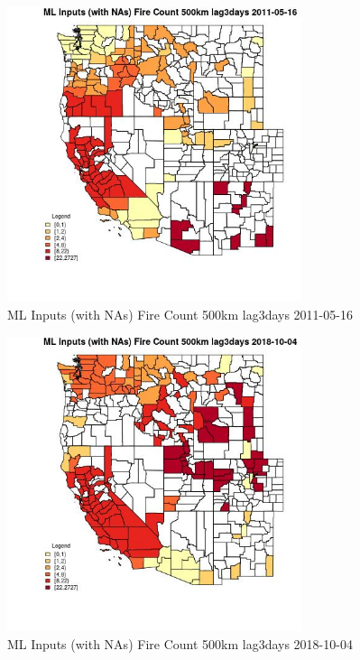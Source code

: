 \begin{figure} 
\centering  
\includegraphics[width=0.77\textwidth]{Code_Outputs/Report_ML_input_PM25_Step4_part_f_de_duplicated_aves_prioritize_24hr_obswNAs_CountyFire_Count_500km_lag3daysMean2011-05-16.jpg} 
\caption{\label{fig:Report_ML_input_PM25_Step4_part_f_de_duplicated_aves_prioritize_24hr_obswNAsCountyFire_Count_500km_lag3daysMean2011-05-16}ML Inputs (with NAs) Fire Count 500km lag3days 2011-05-16} 
\end{figure} 
 

\begin{figure} 
\centering  
\includegraphics[width=0.77\textwidth]{Code_Outputs/Report_ML_input_PM25_Step4_part_f_de_duplicated_aves_prioritize_24hr_obswNAs_CountyFire_Count_500km_lag3daysMean2018-10-04.jpg} 
\caption{\label{fig:Report_ML_input_PM25_Step4_part_f_de_duplicated_aves_prioritize_24hr_obswNAsCountyFire_Count_500km_lag3daysMean2018-10-04}ML Inputs (with NAs) Fire Count 500km lag3days 2018-10-04} 
\end{figure} 
 

